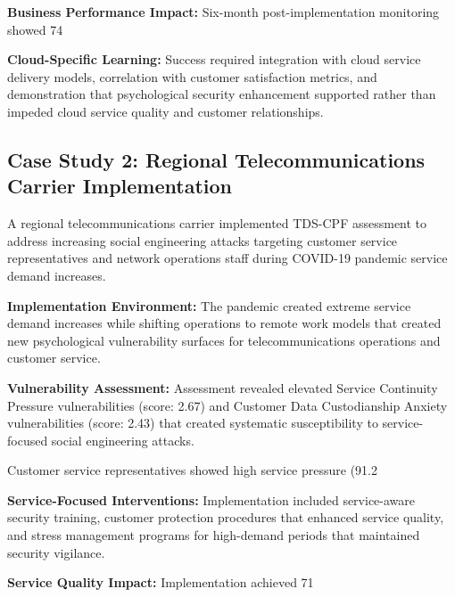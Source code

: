 \documentclass[10pt, twocolumn]{article}
\begin{document}
\textbf{Business Performance Impact:} Six-month post-implementation monitoring showed 74%

\textbf{Cloud-Specific Learning:} Success required integration with cloud service delivery models, correlation with customer satisfaction metrics, and demonstration that psychological security enhancement supported rather than impeded cloud service quality and customer relationships.

\subsection{Case Study 2: Regional Telecommunications Carrier Implementation}

A regional telecommunications carrier implemented TDS-CPF assessment to address increasing social engineering attacks targeting customer service representatives and network operations staff during COVID-19 pandemic service demand increases.

\textbf{Implementation Environment:} The pandemic created extreme service demand increases while shifting operations to remote work models that created new psychological vulnerability surfaces for telecommunications operations and customer service.

\textbf{Vulnerability Assessment:} Assessment revealed elevated Service Continuity Pressure vulnerabilities (score: 2.67) and Customer Data Custodianship Anxiety vulnerabilities (score: 2.43) that created systematic susceptibility to service-focused social engineering attacks.

Customer service representatives showed high service pressure (91.2%

\textbf{Service-Focused Interventions:} Implementation included service-aware security training, customer protection procedures that enhanced service quality, and stress management programs for high-demand periods that maintained security vigilance.

\textbf{Service Quality Impact:} Implementation achieved 71%
\end{document}
